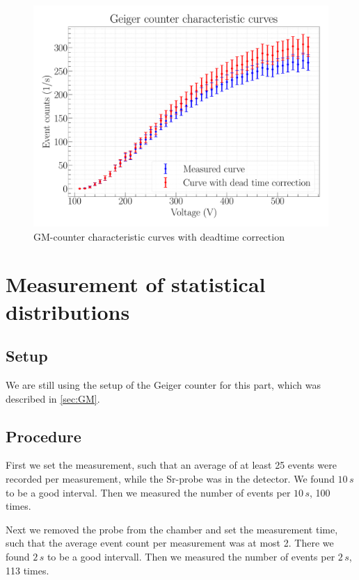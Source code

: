 \begin{figure}[H]
\centering
\includegraphics[width=\textwidth]{../Figures/Geiger_characteristic_curves.pdf}
\caption{GM-counter characteristic curves with deadtime correction}
\label{fig:GeigerCorect}
\end{figure}

\section{Measurement of statistical distributions}

\subsection{Setup}

We are still using the setup of the Geiger counter for this part, which was described in \cref{sec:GM}. 

\subsection{Procedure}

First we set the measurement, such that an average of at least 25 events were recorded per measurement, while the Sr-probe was in the detector. We found $10\,s$ to be a good interval. Then we measured the number of events per $10\,s$, 100 times.

Next we removed the probe from the chamber and set the measurement time, such that the average event count per measurement was at most 2. There we found $2\,s$ to be a good intervall. Then we measured the number of events per $2\,s$, 113 times.


